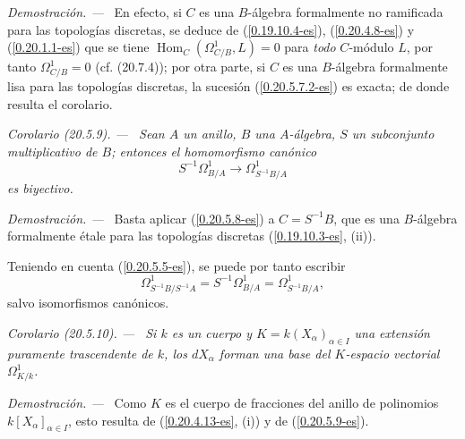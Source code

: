 \documentclass[10pt,oneside]{book}
\makeatletter
\newcommand{\sref}[1]{\textup{(\ref{#1})}}
\newcommand{\setmanualcurrentlabel}[1]{\def\@currentlabel{#1}}
\newenvironment{corollary}[1][]{%
  \setmanualcurrentlabel{#1}\par\medskip\noindent\itshape Corolario (#1). ---\ }{\par}
\newenvironment{proof}{%
  \par\medskip\noindent\textit{Demostración. ---\ }}{\par}
\makeatother
\begin{document}
\begin{proof}
En efecto, si $C$ es una $B$-álgebra formalmente no ramificada para las
topologías discretas, se deduce de \sref{0.19.10.4-es},
\sref{0.20.4.8-es} y \sref{0.20.1.1-es} que se tiene
$\operatorname{Hom}_C(\Omega^1_{C/B},L)=0$ para \emph{todo} $C$-módulo $L$, por tanto
$\Omega^1_{C/B}=0$ (cf. (20.7.4)); por otra parte, si $C$ es una
$B$-álgebra formalmente lisa para las topologías discretas, la sucesión
\sref{0.20.5.7.2-es} es exacta; de donde resulta el corolario.
\end{proof}

\begin{corollary}[20.5.9]
\label{0.20.5.9-es}
Sean $A$ un anillo, $B$ una $A$-álgebra, $S$ un subconjunto multiplicativo de
$B$; entonces el homomorfismo canónico
\begin{equation}
\tag{20.5.9.1}
\label{0.20.5.9.1-es}
  S^{-1}\Omega^1_{B/A}\to\Omega^1_{S^{-1}B/A}
\end{equation}
es biyectivo.
\end{corollary}

\begin{proof}
Basta aplicar \sref{0.20.5.8-es} a $C=S^{-1}B$, que es una
$B$-álgebra formalmente étale para las topologías discretas
(\ref{0.19.10.3-es}, (ii)).
\end{proof}

Teniendo en cuenta \sref{0.20.5.5-es}, se puede por tanto escribir
\begin{equation}
\tag{20.5.9.2}
\label{0.20.5.9.2-es}
  \Omega^1_{S^{-1}B/S^{-1}A}
  =S^{-1}\Omega^1_{B/A}
  =\Omega^1_{S^{-1}B/A},
\end{equation}
salvo isomorfismos canónicos.

\begin{corollary}[20.5.10]
\label{0.20.5.10-es}
Si $k$ es un cuerpo y $K=k(X_\alpha)_{\alpha\in I}$ una extensión puramente trascendente de
$k$, los $dX_\alpha$ forman una base del $K$-espacio vectorial
$\Omega^1_{K/k}$.
\end{corollary}

\begin{proof}
Como $K$ es el cuerpo de fracciones del anillo de polinomios
$k[X_\alpha]_{\alpha\in I}$, esto resulta de (\ref{0.20.4.13-es}, (i)) y de
\sref{0.20.5.9-es}.
\end{proof}
\end{document}
